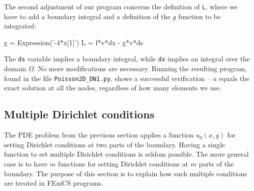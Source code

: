 The second adjustment of our program concerns the definition of {\fontsize{10pt}{10pt}\texttt{L}},
where we have to add a boundary integral and a definition of the $g$
function to be integrated:
\begin{python}
g = Expression('-4*x[1]')
L = f*v*dx - g*v*ds
\end{python}
The {\fontsize{10pt}{10pt}\verb!ds!} variable implies a boundary integral, while {\fontsize{10pt}{10pt}\verb!dx!}
implies an integral over the domain $\Omega$.
No more modifications are necessary. Running the resulting program,
found in the file {\fontsize{10pt}{10pt}\verb!Poisson2D_DN1.py!}, shows a
successful verification -- 
$u$ equals the exact solution at all the nodes, regardless of
how many elements we use.

\subsection{Multiple Dirichlet conditions}
\label{langtangen:poisson:multiple:Dirichlet}

The PDE problem from the previous section applies a function $u_0(x,y)$
for setting Dirichlet conditions at two parts of the boundary.
Having a single function to set multiple Dirichlet conditions is
seldom possible. The more general case is to have $m$ functions for
setting Dirichlet conditions at $m$ parts of the boundary. 
The purpose of this section is to explain how such multiple conditions
are treated in FEniCS programs.

